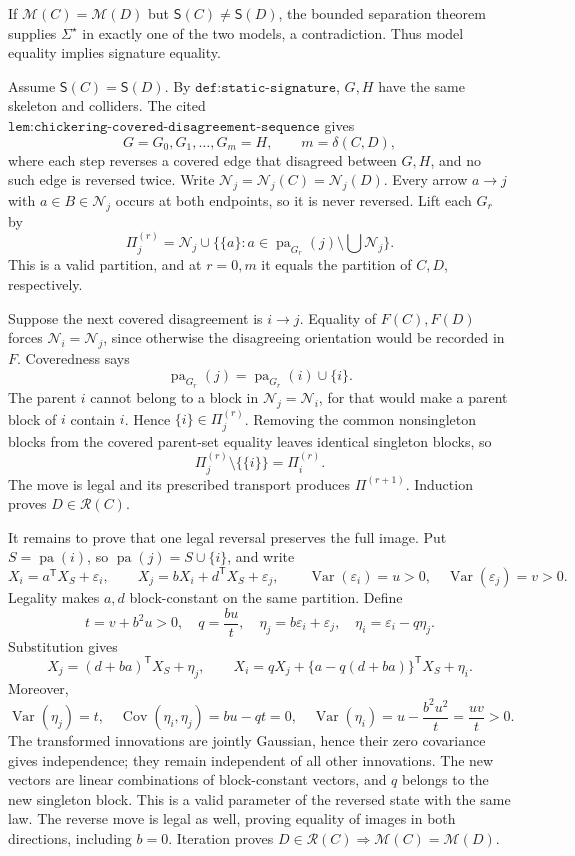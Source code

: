 If \(\mathcal M(C)=\mathcal M(D)\) but \(\mathsf S(C)\ne\mathsf S(D)\), the bounded separation theorem supplies \(\Sigma^{\star}\) in exactly one of the two models, a contradiction.  Thus model equality implies signature equality.

Assume \(\mathsf S(C)=\mathsf S(D)\).  By \(\texttt{def:static-signature}\), \(G,H\) have the same skeleton and colliders.  The cited \(\texttt{lem:chickering-covered-disagreement-sequence}\) gives
\[
 G=G_0,G_1,\ldots,G_m=H,\qquad m=\delta(C,D),
\]
where each step reverses a covered edge that disagreed between \(G,H\), and no such edge is reversed twice.  Write \(\mathcal N_j=\mathcal N_j(C)=\mathcal N_j(D)\).  Every arrow \(a\to j\) with \(a\in B\in\mathcal N_j\) occurs at both endpoints, so it is never reversed.  Lift each \(G_r\) by
\[
 \Pi^{(r)}_j=\mathcal N_j\cup
 \{\{a\}:a\in\operatorname{pa}_{G_r}(j)\setminus\bigcup\mathcal N_j\}.
\]
This is a valid partition, and at \(r=0,m\) it equals the partition of \(C,D\), respectively.

Suppose the next covered disagreement is \(i\to j\).  Equality of \(F(C),F(D)\) forces \(\mathcal N_i=\mathcal N_j\), since otherwise the disagreeing orientation would be recorded in \(F\).  Coveredness says
\[
 \operatorname{pa}_{G_r}(j)=\operatorname{pa}_{G_r}(i)\cup\{i\}.
\]
The parent \(i\) cannot belong to a block in \(\mathcal N_j=\mathcal N_i\), for that would make a parent block of \(i\) contain \(i\).  Hence \(\{i\}\in\Pi^{(r)}_j\).  Removing the common nonsingleton blocks from the covered parent-set equality leaves identical singleton blocks, so
\[
 \Pi^{(r)}_j\setminus\{\{i\}\}=\Pi^{(r)}_i.
\]
The move is legal and its prescribed transport produces \(\Pi^{(r+1)}\).  Induction proves \(D\in\mathcal R(C)\).

It remains to prove that one legal reversal preserves the full image.  Put \(S=\operatorname{pa}(i)\), so \(\operatorname{pa}(j)=S\cup\{i\}\), and write
\[
 X_i=a^{\mathsf T}X_S+\varepsilon_i,\qquad
 X_j=bX_i+d^{\mathsf T}X_S+\varepsilon_j,\qquad
 \operatorname{Var}(\varepsilon_i)=u>0,\quad
 \operatorname{Var}(\varepsilon_j)=v>0.
\]
Legality makes \(a,d\) block-constant on the same partition.  Define
\[
 t=v+b^2u>0,\quad q=\frac{bu}{t},\quad
 \eta_j=b\varepsilon_i+\varepsilon_j,\quad
 \eta_i=\varepsilon_i-q\eta_j.
\]
Substitution gives
\[
 X_j=(d+ba)^{\mathsf T}X_S+\eta_j,\qquad
 X_i=qX_j+\{a-q(d+ba)\}^{\mathsf T}X_S+\eta_i.
\]
Moreover,
\[
 \operatorname{Var}(\eta_j)=t,\quad
 \operatorname{Cov}(\eta_i,\eta_j)=bu-qt=0,\quad
 \operatorname{Var}(\eta_i)=u-\frac{b^2u^2}{t}=\frac{uv}{t}>0.
\]
The transformed innovations are jointly Gaussian, hence their zero covariance gives independence; they remain independent of all other innovations.  The new vectors are linear combinations of block-constant vectors, and \(q\) belongs to the new singleton block.  This is a valid parameter of the reversed state with the same law.  The reverse move is legal as well, proving equality of images in both directions, including \(b=0\).  Iteration proves \(D\in\mathcal R(C)\Rightarrow\mathcal M(C)=\mathcal M(D)\).

